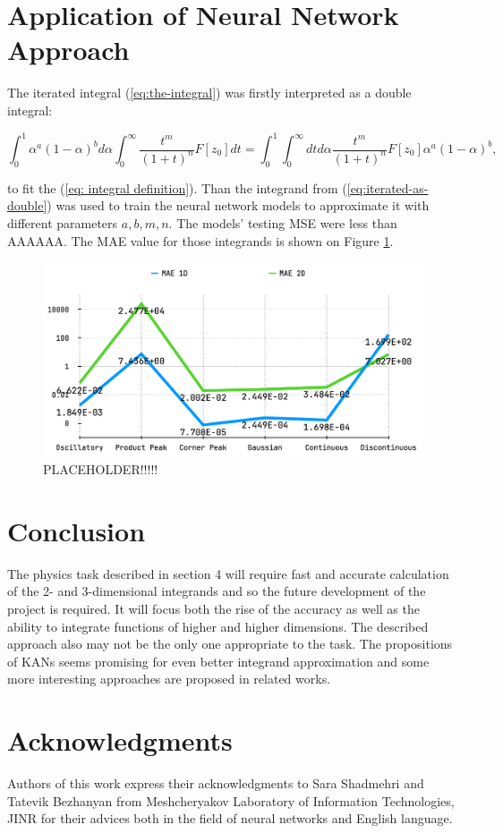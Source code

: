 \documentclass[%
]{ittmm}
\begin{document}
\section{Application of Neural Network Approach}

The iterated integral (\ref{eq:the-integral}) was firstly interpreted as a double integral:

\begin{equation}
    \label{eq:iterated-as-double}
     \int_{0}^{1} \alpha^{a}(1 - \alpha)^bd\alpha \int_{0}^{\infty}\frac{t^m}{(1+t)^n}F[z_{0}]dt = 
     \int_{0}^{1} \int_{0}^{\infty} dtd\alpha \frac{t^m}{(1+t)^n}F[z_{0}]\alpha^{a}(1 - \alpha)^b,
\end{equation}

\noindent to fit the (\ref{eq: integral definition}). Than the integrand from (\ref{eq:iterated-as-double}) was used to train the neural network models to approximate it with different parameters $a, b, m, n$. The models' testing MSE were less than AAAAAA. The MAE value for those integrands is shown on Figure \ref{fig:ph-tests}.

\begin{figure}
\centering
\includegraphics[width=0.85\linewidth]{maes.png}
\caption{ PLACEHOLDER!!!!!}
\label{fig:ph-tests}
\end{figure}

\section{Conclusion}

The physics task described in section 4 will require fast and accurate calculation of the 2- and 3-dimensional integrands and so the future development of the project is required. It will focus both the rise of the accuracy as well as the ability to integrate functions of higher and higher dimensions. The described approach also may not be the only one appropriate to the task. The propositions of KANs \cite{liu} seems promising for even better integrand approximation and some more interesting approaches are proposed in related works.

\section{Acknowledgments}

Authors of this work express their acknowledgments to Sara Shadmehri and Tatevik Bezhanyan from Meshcheryakov Laboratory of Information Technologies, JINR for their advices both in the field of neural networks and English language.


\end{document}
